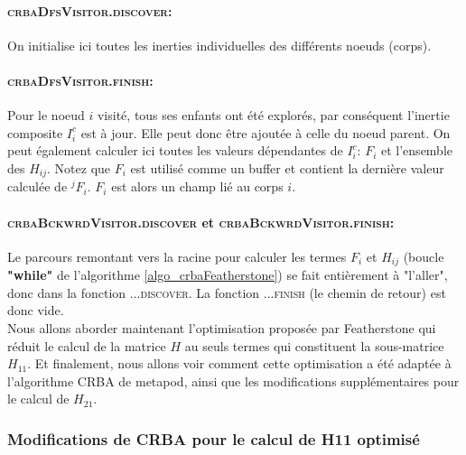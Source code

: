 \documentclass{report}
\begin{document}
\paragraph{\textsc{crbaDfsVisitor.discover}:}
On initialise ici toutes les inerties individuelles des différents noeuds (corps).

\paragraph{\textsc{crbaDfsVisitor.finish}:}
Pour le noeud $i$ visité, tous ses enfants ont été explorés, par conséquent l'inertie composite $I_i^c$ est à jour. Elle peut donc être ajoutée à celle du noeud parent. On peut également calculer ici toutes les valeurs dépendantes de $I_i^c$: $F_i$ et l'ensemble des $H_{ij}$. Notez que $F_i$ est utilisé comme un buffer et contient la dernière valeur calculée de $^jF_i$. $F_i$ est alors un champ lié au corps $i$.

\paragraph{\textsc{crbaBckwrdVisitor.discover} et \textsc{crbaBckwrdVisitor.finish}:}
Le parcours remontant vers la racine pour calculer les termes $F_i$ et $H_{ij}$ (boucle \textbf{"while"} de l'algorithme \ref{algo_crbaFeatherstone}) se fait entièrement à "l'aller", donc dans la fonction \textsc{...discover}. La fonction \textsc{...finish} (le chemin de retour) est donc vide. \\


Nous allons aborder maintenant l'optimisation proposée par Featherstone qui réduit le calcul de la matrice $H$ au seuls termes qui constituent la sous-matrice $H_{11}$. Et finalement, nous allons voir comment cette optimisation a été adaptée à l'algorithme CRBA de metapod, ainsi que les modifications supplémentaires pour le calcul de $H_{21}$.


\subsubsection{Modifications de CRBA pour le calcul de H11 optimisé}
\end{document}
